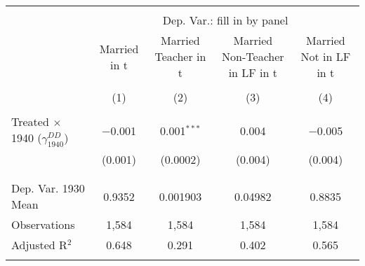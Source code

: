 
\begin{tabular}{@{\extracolsep{5pt}}lcccc} 
\\[-1.8ex]\hline 
\hline \\[-1.8ex] 
 & \multicolumn{4}{c}{Dep. Var.: fill in by panel} \\ 
\cline{2-5} 
 & Married in t & Married Teacher in t & Married Non-Teacher in LF in t & Married Not in LF in t \\ 
\\[-1.8ex] & (1) & (2) & (3) & (4)\\ 
\hline \\[-1.8ex] 
 Treated $\times$ 1940 ($\gamma_{1940}^{DD}$) & $-$0.001 & 0.001$^{***}$ & 0.004 & $-$0.005 \\ 
  & (0.001) & (0.0002) & (0.004) & (0.004) \\ 
  & & & & \\ 
\hline \\[-1.8ex] 
Dep. Var. 1930 Mean & 0.9352 & 0.001903 & 0.04982 & 0.8835 \\ 
Observations & 1,584 & 1,584 & 1,584 & 1,584 \\ 
Adjusted R$^{2}$ & 0.648 & 0.291 & 0.402 & 0.565 \\ 
\hline 
\hline \\[-1.8ex] 
\end{tabular} 
